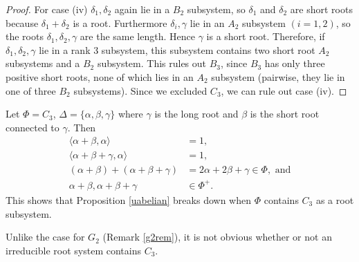 \begin{proof}
For case (iv) $\delta_1, \delta_2$ again lie in a $B_2$ subsystem, so $\delta_1$ and $\delta_2$ are short roots because $\delta_1+\delta_2$ is a root. Furthermore $\delta_i, \gamma$ lie in an $A_2$ subsystem $(i = 1, 2)$, so the roots $\delta_1, \delta_2, \gamma$ are the same length. Hence $\gamma$ is a short root. Therefore, if $\delta_1, \delta_2, \gamma$  lie in a rank 3 subsystem, this subsystem contains two short root $A_2$ subsystems and a $B_2$ subsystem. This rules out $B_3$, since $B_3$ has only three positive short roots, none of which lies in an $A_2$ subsystem (pairwise, they lie in one of three $B_2$ subsystems). Since we excluded $C_3$, we can rule out case (iv).
\end{proof}

\begin{remark}\label{c3counter}
Let $\Phi = C_3$, $\Delta = \{\alpha, \beta, \gamma\}$ where $\gamma$ is the long root and $\beta$ is the short root connected to $\gamma$. Then
\begin{align*}
	\langle \alpha + \beta, \alpha \rangle &= 1, \\
	\langle \alpha + \beta + \gamma, \alpha \rangle &= 1, \\
	(\alpha + \beta) + (\alpha + \beta + \gamma) &= 2\alpha + 2\beta + \gamma \in \Phi, \textrm{ and} \\
	\alpha + \beta, \alpha + \beta + \gamma &\in \Phi^+.
\end{align*}
This shows that Proposition \ref{uabelian} breaks down when $\Phi$ contains $C_3$ as a root subsystem. 
\end{remark}
\begin{remark}\label{c3rem}
Unlike the case for $G_2$ (Remark \ref{g2rem}), it is not obvious whether or not an irreducible root system contains $C_3$.
\end{remark}


